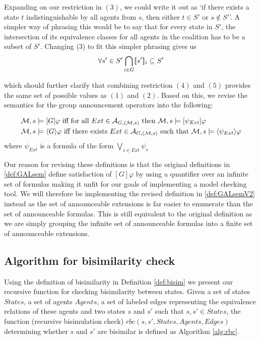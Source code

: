 Expanding on our restriction in $(3)$, we could write it out as `if there exists a state $t$ indistinguishable by all agents from $s$, then either $t\in S'$ or $s\not\in S'$'. A simpler way of phrasing this would be to say that for every state in $S'$, the intersection of its equivalence classes for all agents in the coalition has to be a subset of $S'$. Changing (3) to fit this simpler phrasing gives us
\begin{align}
	\forall s'\in S' \bigcap_{i\in G}\llbracket s'\rrbracket_i\subseteq S'
\end{align}

which should further clarify that combining restriction $(4)$ and $(5)$ provides the same set of possible values as $(1)$ and $(2)$. Based on this, we revise the semantics for the group announcement operators into the following:

\begin{definition}
	\label{def:GALsemV2}
	\begin{align*}
		\mathcal{M},s & \models [G]\varphi \textrm{ iff for all }  Ext\in\mathcal{A}_{G,(\mathcal{M},s)} \textrm{ then } \mathcal{M},s\models [\psi_{Ext}]\varphi\\
		\mathcal{M},s & \models \langle G\rangle\varphi \textrm{ iff there exists } Ext\in\mathcal{A}_{G,(\mathcal{M},s)} \textrm{ such that } \mathcal{M},s\models \langle\psi_{Ext}\rangle\varphi
	\end{align*}
	where $\psi_{Ext}$ is a formula of the form $\bigvee_{s\in Ext}\psi_{s}$
\end{definition}

Our reason for revising these definitions is that the original definitions in \ref{def:GALsem} define satisfaction of $[G]\varphi$ by using a quantifier over an infinite set of formulas making it unfit for our goals of implementing a model checking tool. We will therefore be implementing the revised definition in \ref{def:GALsemV2} instead as the set of announceable extensions is far easier to enumerate than the set of announceable formulas. This is still equivalent to the original definition as we are simply grouping the infinite set of announceable formulas into a finite set of announceable extensions.

\subsection{Algorithm for bisimilarity check}

Using the definition of bisimilarity in Definition \ref{def:bisim} we present our recursive function for checking bisimilarity between states. Given a set of states $States$, a set of agents $Agents$, a set of labeled edges representing the equivalence relations of these agents and two states $s$ and $s'$ such that $s, s' \in States$, the function (recursive bisimulation check) $rbc(s,s',States, Agents, Edges)$ determining whether $s$ and $s'$ are bisimilar is defined as Algorithm \ref{alg:rbc}. 

